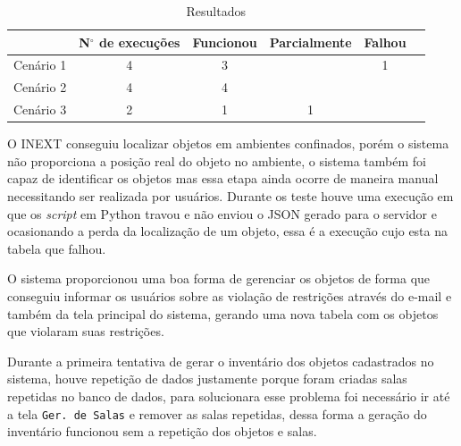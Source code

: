 \begin{table}[htbp]
  \caption{Resultados}
  \label{tab:resultados}
  \begin{tabularx}{\textwidth}{|X|c|c|c|c|c|}
     \hline
    & \textbf{N$^{\circ}$ de execuções} & \textbf{Funcionou } & \textbf{Parcialmente} & \textbf{Falhou} \\
    \hline
    Cenário 1 & 4 & 3 & & 1\\
    \hline
    Cenário 2 & 4 & 4 &  &\\
    \hline
     Cenário 3 & 2 & 1 & 1 &\\
    \hline

  \end{tabularx}
\end{table}

\par
O INEXT conseguiu localizar objetos em ambientes confinados, porém o sistema não proporciona a posição real do objeto no ambiente, o sistema também foi capaz de identificar os objetos mas essa etapa ainda ocorre de maneira manual necessitando ser realizada por usuários. Durante os teste houve uma execução em que os \textit{script} em Python travou e não enviou o JSON gerado para o servidor e ocasionando a perda da localização de um objeto, essa é a execução cujo esta na tabela que falhou.

\par
O sistema proporcionou uma boa forma de gerenciar os objetos de forma que conseguiu informar os usuários sobre as violação de restrições através do e-mail e também da tela principal do sistema, gerando uma nova tabela com os objetos que violaram suas restrições.

\par
Durante a primeira tentativa de gerar o inventário dos objetos cadastrados no sistema, houve repetição de dados justamente porque foram criadas salas repetidas no banco de dados, para solucionara esse problema foi necessário ir até a tela \texttt{Ger. de Salas} e remover as salas repetidas, dessa forma a geração do inventário funcionou sem a repetição dos objetos e salas.

\par

